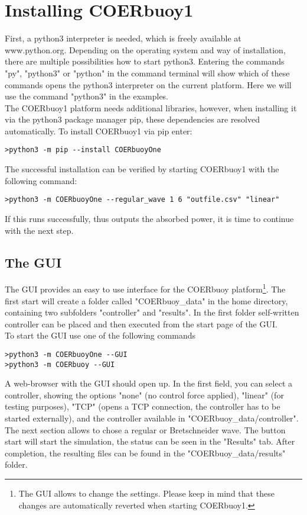 \documentclass[oneside,10pt,a4paper]{book}
\begin{document}
\section{Installing COERbuoy1}
First, a python3 interpreter is needed, which is freely available at www.python.org. Depending on the operating system and way of installation, there are multiple possibilities how to start python3. Entering the commands "py", "python3" or "python" in the command terminal will show which of these commands opens the python3 interpreter on the current platform. Here we will use the command "python3" in the examples.\\
The COERbuoy1 platform needs additional libraries, however, when installing it via the python3 package manager pip, these dependencies are resolved automatically. To install COERbuoy1 via pip enter:
\begin{verbatim}
>python3 -m pip --install COERbuoyOne
\end{verbatim}
The successful installation can be verified by starting COERbuoy1 with the following command:
\begin{verbatim}
>python3 -m COERbuoyOne --regular_wave 1 6 "outfile.csv" "linear"
\end{verbatim}
If this runs successfully, thus outputs the absorbed power, it is time to continue with the next step.
\subsection{The GUI}
The GUI provides an easy to use interface for the COERbuoy platform\footnote{The GUI allows to change the settings. Please keep in mind that these changes are automatically reverted when starting COERbuoy1.}. The first start will create a folder called "COERbuoy\_data" in the home directory, containing two subfolders "controller" and "results". In  the first folder self-written controller can be placed and then executed from the start page of the GUI.\\
To start the GUI use one of the following commands
\begin{verbatim}
>python3 -m COERbuoyOne --GUI
>python3 -m COERbuoy --GUI
\end{verbatim}
A web-browser with the GUI should open up. In the first field, you can select a controller, showing the options "none" (no control force applied), "linear" (for testing purposes), "TCP" (opens a TCP connection, the controller has to be started externally), and the controller available in "COERbuoy\_data/controller".\\
The next section allows to chose a regular or Bretschneider wave. The button start will start the simulation, the status can be seen in the "Results" tab. After completion, the resulting files can be found in the "COERbuoy\_data/results" folder.
\end{document}
